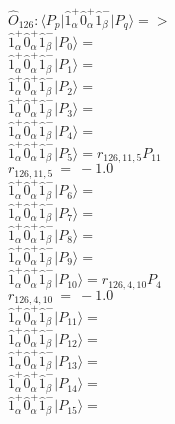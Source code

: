 \documentclass[14pt]{article}
\begin{document}
    $\hat{O}_{126}:  \langle{P_p}\vert \hat{1}_{\alpha}^{+}\hat{0}_{\alpha}^{+}\hat{1}_{\beta}^{-} \vert{P_q}\rangle => $ \\ 
    $ \hat{1}_{\alpha}^{+}\hat{0}_{\alpha}^{+}\hat{1}_{\beta}^{-} \vert{P_{0}}\rangle =  $ \\ 
    $ \hat{1}_{\alpha}^{+}\hat{0}_{\alpha}^{+}\hat{1}_{\beta}^{-} \vert{P_{1}}\rangle =  $ \\ 
    $ \hat{1}_{\alpha}^{+}\hat{0}_{\alpha}^{+}\hat{1}_{\beta}^{-} \vert{P_{2}}\rangle =  $ \\ 
    $ \hat{1}_{\alpha}^{+}\hat{0}_{\alpha}^{+}\hat{1}_{\beta}^{-} \vert{P_{3}}\rangle =  $ \\ 
    $ \hat{1}_{\alpha}^{+}\hat{0}_{\alpha}^{+}\hat{1}_{\beta}^{-} \vert{P_{4}}\rangle =  $ \\ 
    $ \hat{1}_{\alpha}^{+}\hat{0}_{\alpha}^{+}\hat{1}_{\beta}^{-} \vert{P_{5}}\rangle = {r}_{126,11,5}P_{11} $ \\ 
    ${r}_{126,11,5}\ =\ -1.0 $ \\ 
    $ \hat{1}_{\alpha}^{+}\hat{0}_{\alpha}^{+}\hat{1}_{\beta}^{-} \vert{P_{6}}\rangle =  $ \\ 
    $ \hat{1}_{\alpha}^{+}\hat{0}_{\alpha}^{+}\hat{1}_{\beta}^{-} \vert{P_{7}}\rangle =  $ \\ 
    $ \hat{1}_{\alpha}^{+}\hat{0}_{\alpha}^{+}\hat{1}_{\beta}^{-} \vert{P_{8}}\rangle =  $ \\ 
    $ \hat{1}_{\alpha}^{+}\hat{0}_{\alpha}^{+}\hat{1}_{\beta}^{-} \vert{P_{9}}\rangle =  $ \\ 
    $ \hat{1}_{\alpha}^{+}\hat{0}_{\alpha}^{+}\hat{1}_{\beta}^{-} \vert{P_{10}}\rangle = {r}_{126,4,10}P_{4} $ \\ 
    ${r}_{126,4,10}\ =\ -1.0 $ \\ 
    $ \hat{1}_{\alpha}^{+}\hat{0}_{\alpha}^{+}\hat{1}_{\beta}^{-} \vert{P_{11}}\rangle =  $ \\ 
    $ \hat{1}_{\alpha}^{+}\hat{0}_{\alpha}^{+}\hat{1}_{\beta}^{-} \vert{P_{12}}\rangle =  $ \\ 
    $ \hat{1}_{\alpha}^{+}\hat{0}_{\alpha}^{+}\hat{1}_{\beta}^{-} \vert{P_{13}}\rangle =  $ \\ 
    $ \hat{1}_{\alpha}^{+}\hat{0}_{\alpha}^{+}\hat{1}_{\beta}^{-} \vert{P_{14}}\rangle =  $ \\ 
    $ \hat{1}_{\alpha}^{+}\hat{0}_{\alpha}^{+}\hat{1}_{\beta}^{-} \vert{P_{15}}\rangle =  $ \\ 
    
\end{document}
